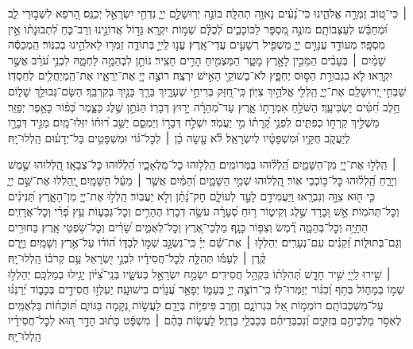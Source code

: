  ׀
כִּי־ט֭וֹב זַמְּרָ֣ה אֱלֹהֵ֑ינוּ כִּי־נָ֝עִ֗ים נָאוָ֥ה תְהִלָּֽה׃
בּוֹנֵ֣ה יְרֽוּשָׁלַ֣‍ִם יְיָ֑ נִדְחֵ֖י יִשְׂרָאֵ֣ל יְכַנֵּֽס׃
הָ֭רֹפֵא לִשְׁב֣וּרֵי לֵ֑ב וּ֝מְחַבֵּ֗שׁ לְעַצְּבוֹתָֽם׃
מוֹנֶ֣ה מִ֭סְפָּר לַכּוֹכָבִ֑ים לְ֝כֻלָּ֗ם שֵׁמ֥וֹת יִקְרָֽא׃
גָּד֣וֹל אֲדוֹנֵ֣ינוּ וְרַב־כֹּ֑חַ לִ֝תְבוּנָת֗וֹ אֵ֣ין מִסְפָּֽר׃
מְעוֹדֵ֣ד עֲנָוִ֣ים יְיָ֑ מַשְׁפִּ֖יל רְשָׁעִ֣ים עֲדֵי־אָֽרֶץ׃
עֱנ֣וּ לַֽייָ֣ בְּתוֹדָ֑ה זַמְּר֖וּ לֵאלֹהֵ֣ינוּ בְכִנּֽוֹר׃
הַֽמְכַסֶּ֬ה שָׁמַ֨יִם ׀ בְּעָבִ֗ים הַמֵּכִ֣ין לָאָ֣רֶץ מָטָ֑ר הַמַּצְמִ֖יחַ הָרִ֣ים חָצִֽיר׃
נוֹתֵ֣ן לִבְהֵמָ֣ה לַחְמָ֑הּ לִבְנֵ֥י עֹ֝רֵ֗ב אֲשֶׁ֣ר יִקְרָֽאוּ׃
לֹ֤א בִגְבוּרַ֣ת הַסּ֣וּס יֶחְפָּ֑ץ לֹא־בְשׁוֹקֵ֖י הָאִ֣ישׁ יִרְצֶֽה׃
רוֹצֶ֣ה יְיָ֭ אֶת־יְרֵאָ֑יו אֶת־הַֽמְיַחֲלִ֥ים לְחַסְדּֽוֹ׃
שַׁבְּחִ֣י יְ֭רוּשָׁלַ‍ִם אֶת־יְיָ֑ הַֽלְלִ֖י אֱלֹהַ֣יִךְ צִיּֽוֹן׃
כִּֽי־חִ֭זַּק בְּרִיחֵ֣י שְׁעָרָ֑יִךְ בֵּרַ֖ךְ בָּנַ֣יִךְ בְּקִרְבֵּֽךְ׃
הַשָּׂם־גְּבוּלֵ֥ךְ שָׁל֑וֹם חֵ֥לֶב חִ֝טִּ֗ים יַשְׂבִּיעֵֽךְ׃
הַשֹּׁלֵ֣חַ אִמְרָת֣וֹ אָ֑רֶץ עַד־מְ֝הֵרָ֗ה יָר֥וּץ דְּבָרֽוֹ׃
הַנֹּתֵ֣ן שֶׁ֣לֶג כַּצָּ֑מֶר כְּ֝פ֗וֹר כָּאֵ֥פֶר יְפַזֵּֽר׃
מַשְׁלִ֣יךְ קַֽרְח֣וֹ כְפִתִּ֑ים לִפְנֵ֥י קָ֝רָת֗וֹ מִ֣י יַעֲמֹֽד׃
יִשְׁלַ֣ח דְּבָר֣וֹ וְיַמְסֵ֑ם יַשֵּׁ֥ב ר֝וּח֗וֹ יִזְּלוּ־מָֽיִם׃
מַגִּ֣יד דְּבָרָ֣ו לְיַעֲקֹ֑ב חֻקָּ֥יו וּ֝מִשְׁפָּטָ֗יו לְיִשְׂרָאֵֽל׃
לֹ֘א עָ֤שָׂה כֵ֨ן ׀ לְכׇל־גּ֗וֹי וּמִשְׁפָּטִ֥ים בַּל־יְדָע֗וּם הַֽלְלוּ־יָֽהּ׃


 ׀
הַֽלְל֣וּ אֶת־יְיָ֭ מִן־הַשָּׁמַ֑יִם הַֽ֝לְל֗וּהוּ בַּמְּרוֹמִֽים׃
הַֽלְל֥וּהוּ כׇל־מַלְאָכָ֑יו הַ֝לְל֗וּהוּ כׇּל־צְבָאָֽו׃
הַֽ֭לְלוּהוּ שֶׁ֣מֶשׁ וְיָרֵ֑חַ הַֽ֝לְל֗וּהוּ כׇּל־כּ֥וֹכְבֵי אֽוֹר׃
הַֽ֭לְלוּהוּ שְׁמֵ֣י הַשָּׁמָ֑יִם וְ֝הַמַּ֗יִם אֲשֶׁ֤ר ׀ מֵעַ֬ל הַשָּׁמָֽיִם׃
יְֽ֭הַלְלוּ אֶת־שֵׁ֣ם יְיָ֑ כִּ֤י ה֖וּא צִוָּ֣ה וְנִבְרָֽאוּ׃
וַיַּעֲמִידֵ֣ם לָעַ֣ד לְעוֹלָ֑ם חׇק־נָ֝תַ֗ן וְלֹ֣א יַעֲבֽוֹר׃
הַֽלְל֣וּ אֶת־יְיָ֭ מִן־הָאָ֑רֶץ תַּ֝נִּינִ֗ים וְכׇל־תְּהֹמֽוֹת׃
אֵ֣שׁ וּ֭בָרָד שֶׁ֣לֶג וְקִיט֑וֹר ר֥וּחַ סְ֝עָרָ֗ה עֹשָׂ֥ה דְבָרֽוֹ׃
הֶהָרִ֥ים וְכׇל־גְּבָע֑וֹת עֵ֥ץ פְּ֝רִ֗י וְכׇל־אֲרָזִֽים׃
הַחַיָּ֥ה וְכׇל־בְּהֵמָ֑ה רֶ֗֝מֶשׂ וְצִפּ֥וֹר כָּנָֽף׃
מַלְכֵי־אֶ֭רֶץ וְכׇל־לְאֻמִּ֑ים שָׂ֝רִ֗ים וְכׇל־שֹׁ֥פְטֵי אָֽרֶץ׃
בַּחוּרִ֥ים וְגַם־בְּתוּל֑וֹת זְ֝קֵנִ֗ים עִם־נְעָרִֽים׃
יְהַלְל֤וּ ׀ אֶת־שֵׁ֬ם יְיָ֗ כִּֽי־נִשְׂגָּ֣ב שְׁמ֣וֹ לְבַדּ֑וֹ
ה֝וֹד֗וֹ עַל־אֶ֥רֶץ וְשָׁמָֽיִם׃ וַיָּ֤רֶם קֶ֨רֶן ׀ לְעַמּ֡וֹ תְּהִלָּ֤ה לְֽכׇל־חֲסִידָ֗יו
לִבְנֵ֣י יִ֭שְׂרָאֵל עַ֥ם קְרֹב֗וֹ הַֽלְלוּ־יָֽהּ׃\\
 ׀
שִׁ֣ירוּ לַֽייָ֭ שִׁ֣יר חָדָ֑שׁ תְּ֝הִלָּת֗וֹ בִּקְהַ֥ל חֲסִידִֽים׃
יִשְׂמַ֣ח יִשְׂרָאֵ֣ל בְּעֹשָׂ֑יו בְּנֵֽי־צִ֝יּ֗וֹן יָגִ֥ילוּ בְמַלְכָּֽם׃
יְהַלְל֣וּ שְׁמ֣וֹ בְמָח֑וֹל בְּתֹ֥ף וְ֝כִנּ֗וֹר יְזַמְּרוּ־לֽוֹ׃
כִּֽי־רוֹצֶ֣ה יְיָ֣ בְּעַמּ֑וֹ יְפָאֵ֥ר עֲ֝נָוִ֗ים בִּישׁוּעָֽה׃
יַעְלְז֣וּ חֲסִידִ֣ים בְּכָב֑וֹד יְ֝רַנְּנ֗וּ עַל־מִשְׁכְּבוֹתָֽם׃
רוֹמְמ֣וֹת אֵ֭ל בִּגְרוֹנָ֑ם וְחֶ֖רֶב פִּיפִיּ֣וֹת בְּיָדָֽם׃
לַעֲשׂ֣וֹת נְ֭קָמָה בַּגּוֹיִ֑ם תּ֝וֹכֵח֗וֹת בַּלְאֻמִּֽים׃
לֶאְסֹ֣ר מַלְכֵיהֶ֣ם בְּזִקִּ֑ים וְ֝נִכְבְּדֵיהֶ֗ם בְּכַבְלֵ֥י בַרְזֶֽל׃
לַעֲשׂ֤וֹת בָּהֶ֨ם ׀ מִשְׁפָּ֬ט כָּת֗וּב הָדָ֣ר ה֭וּא לְכׇל־חֲסִידָ֗יו הַֽלְלוּ־יָֽהּ׃

